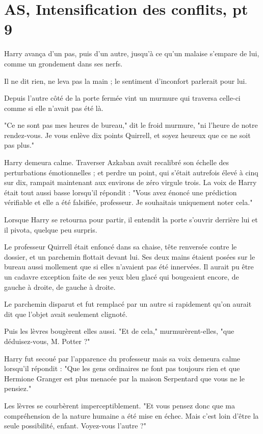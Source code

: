 
\chapter{AS, Intensification des conflits, pt 9}

Harry avança d'un pas, puis d'un autre, jusqu'à ce qu'un malaise s'empare de lui, comme un grondement dans ses nerfs.

Il ne dit rien, ne leva pas la main ; le sentiment d'inconfort parlerait pour lui.

Depuis l'autre côté de la porte fermée vint un murmure qui traversa celle-ci comme si elle n'avait pas été là.

"Ce ne sont pas mes heures de bureau," dit le froid murmure, "ni l'heure de notre rendez-vous. Je vous enlève dix points Quirrell, et soyez heureux que ce ne soit pas plus."

Harry demeura calme. Traverser Azkaban avait recalibré son échelle des perturbations émotionnelles ; et perdre un point, qui s'était autrefois élevé à cinq sur dix, rampait maintenant aux environs de zéro virgule trois. La voix de Harry était tout aussi basse lorsqu'il répondit : "Vous avez énoncé une prédiction vérifiable et elle a été falsifiée, professeur. Je souhaitais uniquement noter cela."

Lorsque Harry se retourna pour partir, il entendit la porte s'ouvrir derrière lui et il pivota, quelque peu surpris.

Le professeur Quirrell était enfoncé dans sa chaise, tête renversée contre le dossier, et un parchemin flottait devant lui. Ses deux mains étaient posées sur le bureau aussi mollement que si elles n'avaient pas été innervées. Il aurait pu être un cadavre exception faite de ses yeux bleu glacé qui bougeaient encore, de gauche à droite, de gauche à droite.

Le parchemin disparut et fut remplacé par un autre si rapidement qu'on aurait dit que l'objet avait seulement clignoté.

Puis les lèvres bougèrent elles aussi. "Et de cela," murmurèrent-elles, "que déduisez-vous, M. Potter ?"

Harry fut secoué par l'apparence du professeur mais sa voix demeura calme lorsqu'il répondit : "Que les gens ordinaires ne font pas toujours rien et que Hermione Granger est plus menacée par la maison Serpentard que vous ne le pensiez."

Les lèvres se courbèrent imperceptiblement. "Et vous pensez donc que ma compréhension de la nature humaine a été mise en échec. Mais c'est loin d'être la seule possibilité, enfant. Voyez-vous l'autre ?"

